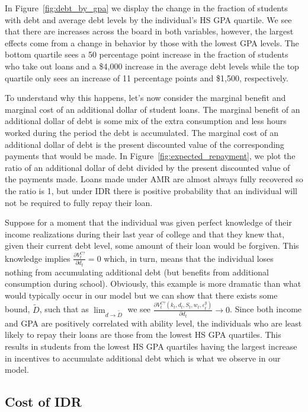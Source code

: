   In Figure~\ref{fig:debt_by_gpa} we display the change in the fraction of students with debt and
  average debt levels by the individual's HS GPA quartile. We see that there are increases across
  the board in both variables, however, the largest effects come from a change in behavior by those
  with the lowest GPA levels. The bottom quartile sees a 50 percentage point increase in the
  fraction of students who take out loans and a \$4,000 increase in the average debt levels while
  the top quartile only sees an increase of 11 percentage points and \$1,500, respectively.

  To understand why this happens, let's now consider the marginal benefit and marginal cost of an
  additional dollar of student loans. The marginal benefit of an additional dollar of debt is some
  mix of the extra consumption and less hours worked during the period the debt is accumulated. The
  marginal cost of an additional dollar of debt is the present discounted value of the corresponding
  payments that would be made. In Figure~\ref{fig:expected_repayment}, we plot the ratio of an
  additional dollar of debt divided by the present discounted value of the payments made. Loans made
  under AMR are almost always fully recovered so the ratio is 1, but under IDR there is positive
  probability that an individual will not be required to fully repay their loan.

  Suppose for a moment that the individual was given perfect knowledge of their income realizations
  during their last year of college and that they knew that, given their current debt level,
  some amount of their loan would be forgiven. This knowledge implies
  $\frac{\partial V^{C?}_t}{\partial d_t} = 0$ which, in turn, means that the individual loses
  nothing from accumulating additional debt (but benefits from additional consumption during
  school). Obviously, this example is more dramatic than what would typically occur in our model but
  we can show that there exists some bound, $\tilde{D}$, such that as
  $\lim_{d \rightarrow \tilde{D}}$ we see
  $\frac{\partial V^{C?}_t(k_t, d_t, S_t, w_t, \varepsilon^y_t)}{\partial d_t} \rightarrow 0$. Since
  both income and GPA are positively correlated with ability level, the individuals who are least
  likely to repay their loans are those from the lowest HS GPA quartiles. This results in students
  from the lowest HS GPA quartiles having the largest increase in incentives to accumulate
  additional debt which is what we observe in our model.


\subsection{Cost of IDR}


